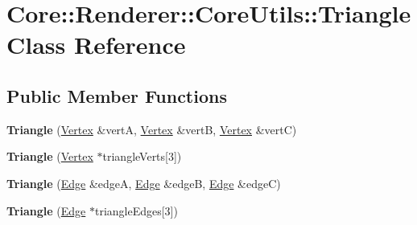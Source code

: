 \hypertarget{class_core_1_1_renderer_1_1_core_utils_1_1_triangle}{\section{Core\+:\+:Renderer\+:\+:Core\+Utils\+:\+:Triangle Class Reference}
\label{class_core_1_1_renderer_1_1_core_utils_1_1_triangle}
}
\subsection*{Public Member Functions}
\begin{DoxyCompactItemize}
\item 
\hypertarget{class_core_1_1_renderer_1_1_core_utils_1_1_triangle_afdb214d96f4af1155df56f3507c72514}{{\bfseries Triangle} (\hyperlink{class_core_1_1_renderer_1_1_core_utils_1_1_vertex}{Vertex} \&vert\+A, \hyperlink{class_core_1_1_renderer_1_1_core_utils_1_1_vertex}{Vertex} \&vert\+B, \hyperlink{class_core_1_1_renderer_1_1_core_utils_1_1_vertex}{Vertex} \&vert\+C)}\label{class_core_1_1_renderer_1_1_core_utils_1_1_triangle_afdb214d96f4af1155df56f3507c72514}

\item 
\hypertarget{class_core_1_1_renderer_1_1_core_utils_1_1_triangle_a6f9334d955ded8fb04099ce973bb82c8}{{\bfseries Triangle} (\hyperlink{class_core_1_1_renderer_1_1_core_utils_1_1_vertex}{Vertex} $\ast$triangle\+Verts\mbox{[}3\mbox{]})}\label{class_core_1_1_renderer_1_1_core_utils_1_1_triangle_a6f9334d955ded8fb04099ce973bb82c8}

\item 
\hypertarget{class_core_1_1_renderer_1_1_core_utils_1_1_triangle_a2e81e9c50d2e6e64a8355b4d4535b772}{{\bfseries Triangle} (\hyperlink{class_core_1_1_renderer_1_1_core_utils_1_1_edge}{Edge} \&edge\+A, \hyperlink{class_core_1_1_renderer_1_1_core_utils_1_1_edge}{Edge} \&edge\+B, \hyperlink{class_core_1_1_renderer_1_1_core_utils_1_1_edge}{Edge} \&edge\+C)}\label{class_core_1_1_renderer_1_1_core_utils_1_1_triangle_a2e81e9c50d2e6e64a8355b4d4535b772}

\item 
\hypertarget{class_core_1_1_renderer_1_1_core_utils_1_1_triangle_a0c64d822d27068b53b4f1ab5d0770915}{{\bfseries Triangle} (\hyperlink{class_core_1_1_renderer_1_1_core_utils_1_1_edge}{Edge} $\ast$triangle\+Edges\mbox{[}3\mbox{]})}\label{class_core_1_1_renderer_1_1_core_utils_1_1_triangle_a0c64d822d27068b53b4f1ab5d0770915}


\end{DoxyCompactItemize}
